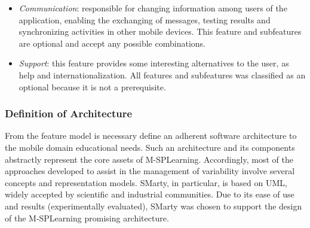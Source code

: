 \begin{itemize}
    \item \textit{Communication}: responsible for changing information among users of the application, enabling the exchanging of messages, testing results and synchronizing activities in other mobile devices. This feature and subfeatures are optional and accept any possible combinations.
    
    \item \textit{Support}: this feature provides some interesting alternatives to the user, as help and internationalization. All features and subfeatures was classified as an optional because it is not a prerequisite.
\end{itemize}

\subsubsection{Definition of Architecture}

From the feature model is necessary define an adherent software architecture to the mobile domain educational needs. Such an architecture and its components abstractly represent the core assets of M-SPLear\allowbreak ning. Accordingly, most of the approaches developed to assist in the management of variability involve several concepts and representation models. SMarty, in particular, is based on UML, widely accepted by scientific and industrial communities. Due to its ease of use and results (experimentally evaluated), SMarty was chosen to support the design of the M-SPLear\allowbreak ning promising architecture.

